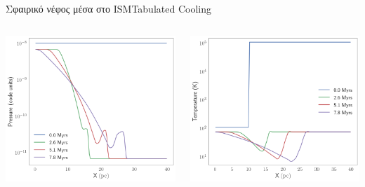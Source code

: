 \documentclass{beamer}
\begin{document}
\begin{frame}{Σφαιρικό νέφος μέσα στο ISM}{Tabulated Cooling}
	\begin{columns}
			\begin{center}
				\includegraphics[width=1\linewidth]{../Document/DataImages/TabCoolingPRSprofile}
			\end{center}
			\begin{center}
				\includegraphics[width=1\linewidth]{../Document/DataImages/TabCoolingTMPprofile}
			\end{center}
	\end{columns}
\end{frame}
\end{document}
